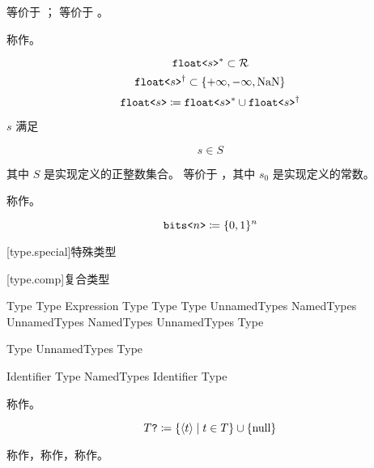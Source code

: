  等价于 ； 等价于 。

\pnum
{} 称作。

$$ \texttt{float<}s\texttt{>}^\ast \subset \mathcal{R} $$
$$ \texttt{float<}s\texttt{>}^\dagger \subset \{ +\infty, -\infty, \mathrm{NaN} \} $$
$$ \texttt{float<}s\texttt{>} \coloneqq \texttt{float<}s\texttt{>}^\ast \cup \texttt{float<}s\texttt{>}^\dagger $$

$s$ 满足

$$ s \in S $$

其中 $S$ 是实现定义的正整数集合。 等价于 ，其中 $s_0$ 是实现定义的常数。

\pnum
{} 称作。

$$ \texttt{bits<}n\texttt{>} \coloneqq \{ 0, 1 \}^n $$

[type.special]{特殊类型}

\begin{bnf}
 \br
     \br
\end{bnf}

[type.comp]{复合类型}

\begin{bnf}
 \br
    Type  \br
    Type \terminal{[} Expression\bnfq  \terminal{]} \br
    Type \terminal{\{} \terminal{\}} \br
    Type \terminal{[} Type \terminal{]}
    \terminal{(} UnnamedTypes \terminal{)} \br
    \terminal{(} NamedTypes \terminal{)} \br
    \terminal{(} UnnamedTypes \terminal{,} NamedTypes \terminal{)} \br
    \terminal{\{} UnnamedTypes \terminal{\}}
    Type \terminal{*}
\end{bnf}

\begin{bnf}
 \br
    Type \br
    UnnamedTypes \terminal{,} Type
\end{bnf}

\begin{bnf}
 \br
    Identifier \terminal{:} Type \br
    NamedTypes \terminal{,} Identifier \terminal{:} Type
\end{bnf}

\pnum
{} 称作。

$$ T\texttt{?} \coloneqq \{ \langle t \rangle \mid t \in T \} \cup \{ \mathrm{null} \} $$

\pnum
{} 称作，称作，称作。

